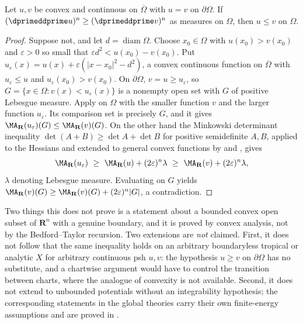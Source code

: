 \begin{corollary}
\label{cor:ch16-domination-chart}
Let $u,v$ be convex and continuous on $\overline\Omega$ with $u=v$ on
$\partial\Omega$.  If $(\dprimeddprime u)^n\geq(\dprimeddprime v)^n$ as
measures on $\Omega$, then $u\leq v$ on $\Omega$.
\end{corollary}

\begin{proof}
Suppose not, and let $d=\operatorname{diam}\Omega$.  Choose $x_0\in\Omega$
with $u(x_0)>v(x_0)$ and $\varepsilon>0$ so small that
$\varepsilon d^2<u(x_0)-v(x_0)$.  Put
$u_\varepsilon(x)=u(x)+\varepsilon(|x-x_0|^2-d^2)$, a convex continuous
function on $\overline\Omega$ with $u_\varepsilon\leq u$ and
$u_\varepsilon(x_0)>v(x_0)$.  On $\partial\Omega$,
$v=u\geq u_\varepsilon$, so
$G=\{x\in\Omega:v(x)<u_\varepsilon(x)\}$ is a nonempty open set with
$G$ of positive Lebesgue measure.  Apply
 on $\Omega$ with the smaller function $v$
and the larger function $u_\varepsilon$.  Its comparison set is precisely
$G$, and it gives
$\MA_{\mathbf R}(u_\varepsilon)(G)\leq\MA_{\mathbf R}(v)(G)$.  On the other
hand the Minkowski determinant inequality
$\det(A+B)\geq\det A+\det B$ for positive semidefinite $A,B$, applied to the
Hessians and extended to general convex functions by
 and
, gives
\[
 \MA_{\mathbf R}(u_\varepsilon)\ \geq\ \MA_{\mathbf R}(u)
   +(2\varepsilon)^n\lambda
 \ \geq\ \MA_{\mathbf R}(v)+(2\varepsilon)^n\lambda ,
\]
$\lambda$ denoting Lebesgue measure.  Evaluating on $G$ yields
$\MA_{\mathbf R}(v)(G)\geq\MA_{\mathbf R}(v)(G)+(2\varepsilon)^n|G|$, a
contradiction.
\end{proof}

\begin{warning}{Two things this does not prove}
 is a statement about a bounded convex open subset
of $\mathbf R^n$ with a genuine boundary, and it is proved by convex
analysis, not by the Bedford--Taylor recursion.  Two extensions are
\emph{not} claimed.  First, it does not follow that the same inequality
holds on an arbitrary boundaryless tropical or analytic $X$ for arbitrary
continuous psh $u,v$: the hypothesis $u\geq v$ on $\partial\Omega$ has no
substitute, and a chartwise argument would have to control the transition
between charts, where the analogue of convexity is not available.  Second,
it does not extend to unbounded potentials without an integrability
hypothesis; the corresponding statements in the global theories carry their
own finite-energy assumptions and are proved in
.
\end{warning}

